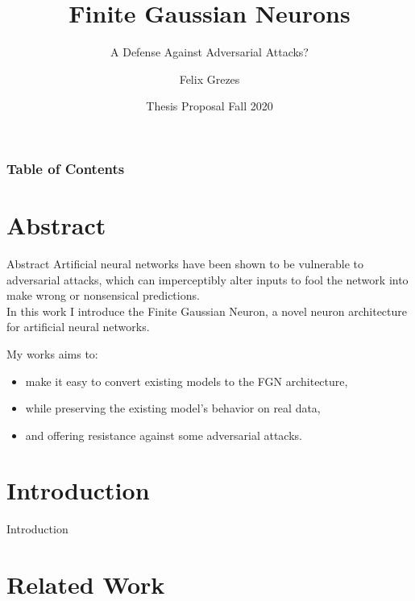\documentclass{beamer}
\title[FGNs vs Adversarial Attacks] %
{Finite Gaussian Neurons}
\subtitle{A Defense Against Adversarial Attacks?}
\author[Felix Grezes] %
{Felix Grezes}
\institute[CUNY GC] %
{
  \inst{}%
  Graduate Center\\
  City University of New York
}
\date[Thesis Proposal - Fall 2020] %
{Thesis Proposal Fall 2020}
\begin{document}
\frame{\titlepage}

\begin{frame}
    \frametitle{Table of Contents}
    \tableofcontents
\end{frame}


\section{Abstract}
\begin{frame}{Abstract}
Artificial neural networks have been shown to be vulnerable to adversarial attacks, which can imperceptibly alter inputs to fool the network into make wrong or nonsensical predictions.\\
\vspace{2mm}
In this work I introduce the Finite Gaussian Neuron, a novel neuron architecture for artificial neural networks.\\
\vspace{2mm}

My works aims to:
\begin{itemize}
    \item make it easy to convert existing models to the FGN architecture,
    \item while preserving the existing model's behavior on real data,
    \item and offering resistance against some adversarial attacks.
\end{itemize}

\end{frame}


\section{Introduction}
\begin{frame}{Introduction}
    
\end{frame}


\section{Related Work}
\end{document}
